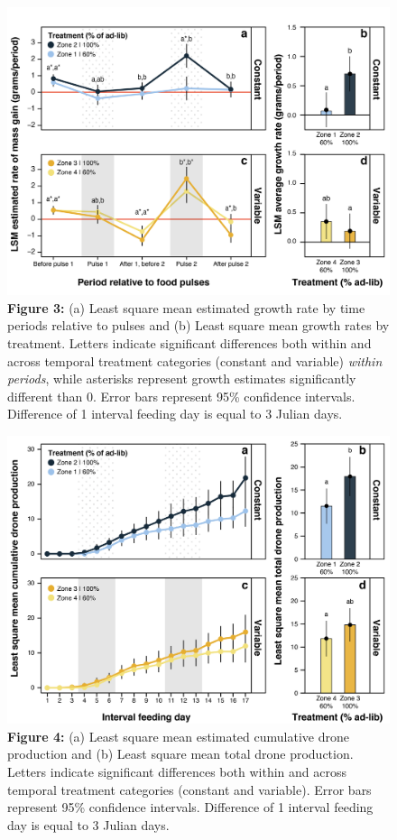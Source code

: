 \documentclass[11pt,]{article}
\begin{document}
\clearpage

\newpage

\begin{figure}
\centering
\includegraphics{./fig3_mc_growth.png}
\caption{\textbf{Figure 3:} (a) Least square mean estimated growth rate
by time periods relative to pulses and (b) Least square mean growth
rates by treatment. Letters indicate significant differences both within
and across temporal treatment categories (constant and variable)
\emph{within periods}, while asterisks represent growth estimates
significantly different than 0. Error bars represent 95\% confidence
intervals. Difference of 1 interval feeding day is equal to 3 Julian
days.}
\end{figure}

\clearpage

\newpage

\begin{figure}
\centering
\includegraphics{./fig4_drones.png}
\caption{\textbf{Figure 4:} (a) Least square mean estimated cumulative
drone production and (b) Least square mean total drone production.
Letters indicate significant differences both within and across temporal
treatment categories (constant and variable). Error bars represent 95\%
confidence intervals. Difference of 1 interval feeding day is equal to 3
Julian days.}
\end{figure}
\end{document}
